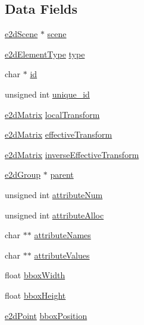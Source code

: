 \subsection*{Data Fields}
\begin{DoxyCompactItemize}
\item 
\hyperlink{structe2dScene}{e2d\-Scene} $\ast$ \hyperlink{structe2dElement_a0ebd8fae058dd45496c86a2ca317ca9c}{scene}
\item 
\hyperlink{group__e2dElement_ga9bc8cfdec08c7e9069fc707ee456fd38}{e2d\-Element\-Type} \hyperlink{structe2dElement_a7df43d7f6c23b61b843acb56eb3ca19a}{type}
\item 
char $\ast$ \hyperlink{structe2dElement_aecb3b0d045ada529257a2fbf8f829599}{id}
\item 
unsigned int \hyperlink{structe2dElement_a300bb6cf5b184e200523e9bce8346dc4}{unique\-\_\-id}
\item 
\hyperlink{structe2dMatrix}{e2d\-Matrix} \hyperlink{structe2dElement_a52bda732df714953f93c1e6f5f7c7c93}{local\-Transform}
\item 
\hyperlink{structe2dMatrix}{e2d\-Matrix} \hyperlink{structe2dElement_a6c8e26945f09b5157e2111e42f99b879}{effective\-Transform}
\item 
\hyperlink{structe2dMatrix}{e2d\-Matrix} \hyperlink{structe2dElement_a5e6d7341f2dbef1923b0a3fcc13781c6}{inverse\-Effective\-Transform}
\item 
\hyperlink{structe2dGroup}{e2d\-Group} $\ast$ \hyperlink{structe2dElement_a3e62eb2fbf1d6bc6d6fe549096a6cee9}{parent}
\item 
unsigned int \hyperlink{structe2dElement_a836181401227a3ca42da026a8d35e730}{attribute\-Num}
\item 
unsigned int \hyperlink{structe2dElement_a70d94929e3789bf7c019c939b0084985}{attribute\-Alloc}
\item 
char $\ast$$\ast$ \hyperlink{structe2dElement_af9b5d9dbbf270b6f92a3ee66ce1b47ac}{attribute\-Names}
\item 
char $\ast$$\ast$ \hyperlink{structe2dElement_ae8591ff93c366b4d66817a70f2d9f33e}{attribute\-Values}
\item 
float \hyperlink{structe2dElement_a6a1d9b223870deeaec7f5e8b23ca4b22}{bbox\-Width}
\item 
float \hyperlink{structe2dElement_a680d0d4219ac8720005c46b55a9676ae}{bbox\-Height}
\item 
\hyperlink{structe2dPoint}{e2d\-Point} \hyperlink{structe2dElement_ac2c17ce4cba805b594b314a77923cbf5}{bbox\-Position}
\end{DoxyCompactItemize}


